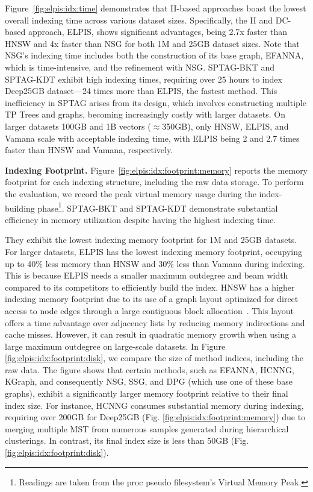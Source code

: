  Figure~\ref{fig:elpis:idx:time} demonstrates that II-based approaches boast the lowest overall indexing time across various dataset sizes. Specifically, the II and DC-based approach, ELPIS, shows significant advantages, being 2.7x faster than HNSW and 4x faster than NSG for both 1M and 25GB dataset sizes. Note that NSG's indexing time includes both the construction of its base graph, EFANNA, which is time-intensive, and the refinement with NSG. SPTAG-BKT and SPTAG-KDT exhibit high indexing times, requiring over 25 hours to index Deep25GB dataset—24 times more than ELPIS, the fastest method. This inefficiency in SPTAG arises from its design, which involves constructing multiple TP Trees and graphs, becoming increasingly costly with larger datasets. On larger datasets 100GB and 1B vectors ($\approx$350GB), only HNSW, ELPIS, and Vamana scale with acceptable indexing time, with ELPIS being 2 and 2.7 times faster than HNSW and Vamana, respectively.


\noindent\textbf{Indexing Footprint.}
Figure~\ref{fig:elpis:idx:footprint:memory} reports the memory footprint for each indexing structure, including the raw data storage. To perform the evaluation, we record the peak virtual memory usage during the index-building phase\footnote{Readings are taken from the proc pseudo filesystem’s Virtual Memory Peak.}. SPTAG-BKT and SPTAG-KDT demonstrate substantial efficiency in memory utilization despite having the highest indexing time. 

They exhibit the lowest indexing memory footprint for 1M and 25GB datasets. For larger datasets, ELPIS has the lowest indexing memory footprint, occupying up to 40\% less memory than HNSW and 30\% less than Vamana during indexing. This is because ELPIS needs a smaller maximum outdegree and beam width compared to its competitors to efficiently build the index. HNSW has a higher indexing memory footprint due to its use of a graph layout optimized for direct access to node edges through a large contiguous block allocation~\cite{url/hnsw}. This layout offers a time advantage over adjacency lists by reducing memory indirections and cache misses. However, it can result in quadratic memory growth when using a large maximum outdegree on large-scale datasets. 
In Figure \ref{fig:elpis:idx:footprint:disk}, we compare the size of method indices, including the raw data. The figure shows that certain methods, such as EFANNA, HCNNG, KGraph, and consequently NSG, SSG, and DPG (which use one of these base graphs), exhibit a significantly larger memory footprint relative to their final index size. For instance, HCNNG consumes substantial memory during indexing, requiring over 200GB for Deep25GB (Fig. \ref{fig:elpis:idx:footprint:memory}) due to merging multiple MST from numerous samples generated during hierarchical clusterings. In contrast, its final index size is less than 50GB (Fig. \ref{fig:elpis:idx:footprint:disk}).

